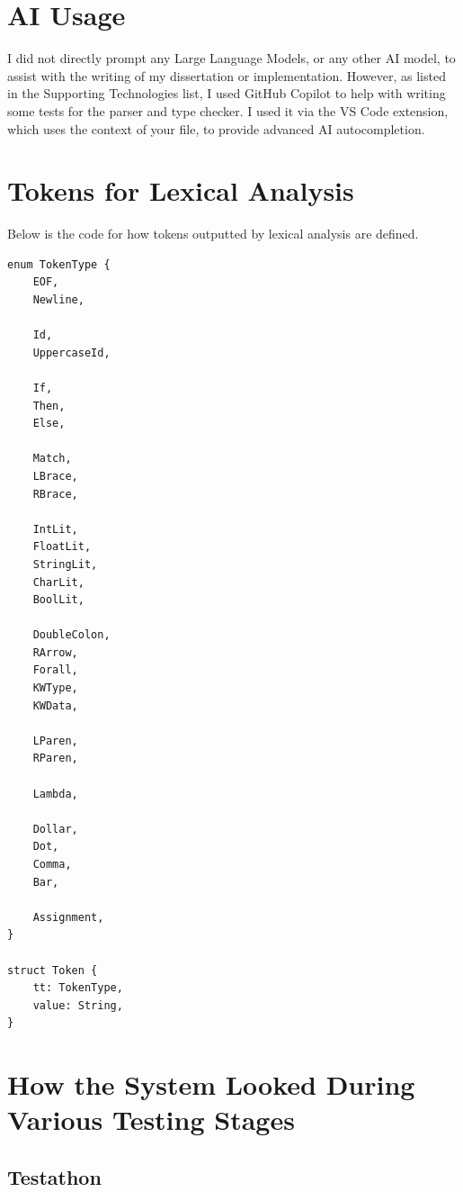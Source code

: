 
\appendix

\chapter{AI Usage}
\label{appx:ai_prompt}

I did not directly prompt any Large Language Models, or any other AI model, to assist with the writing of my dissertation or implementation. However, as listed in the Supporting Technologies list, I used GitHub Copilot to help with writing some tests for the parser and type checker. I used it via the VS Code extension, which uses the context of your file, to provide advanced AI autocompletion.


\chapter{Tokens for Lexical Analysis}
\label{appx:tokens}
Below is the code for how tokens outputted by lexical analysis are defined. 
\begin{lstlisting}
enum TokenType {
    EOF,
    Newline,

    Id,
    UppercaseId,

    If,
    Then,
    Else,

    Match,
    LBrace,
    RBrace,

    IntLit,
    FloatLit,
    StringLit,
    CharLit,
    BoolLit,

    DoubleColon,
    RArrow,
    Forall,
    KWType,
    KWData,

    LParen,
    RParen,

    Lambda,

    Dollar,
    Dot,
    Comma,
    Bar,

    Assignment,
}

struct Token {
    tt: TokenType,
    value: String,
}
\end{lstlisting}

\chapter{How the System Looked During Various Testing Stages}
\section{Testathon}

